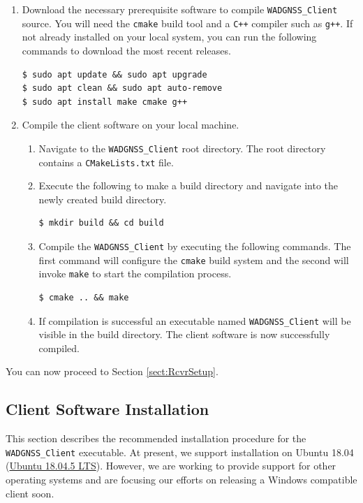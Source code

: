 \begin{enumerate}
\item Download the necessary prerequisite software to compile \texttt{WADGNSS\_Client} source. You will need the \texttt{cmake} build tool and a \texttt{C++} compiler such as \texttt{g++}. If not already installed on your local system, you can run the following commands to download the most recent releases.
\begin{verbatim}
$ sudo apt update && sudo apt upgrade 
$ sudo apt clean && sudo apt auto-remove 
$ sudo apt install make cmake g++ 
\end{verbatim}

\item Compile the client software on your local machine.

\begin{enumerate}
\item Navigate to the \texttt{WADGNSS\_Client} root directory. The root directory contains a \texttt{CMakeLists.txt} file.

\item Execute the following to make a build directory and navigate into the newly created build directory. 
\begin{verbatim}
$ mkdir build && cd build 
\end{verbatim}

\item Compile the \texttt{WADGNSS\_Client} by executing the following commands. The first command will configure the \texttt{cmake} build system and the second will invoke \texttt{make} to start the compilation process.
\begin{verbatim}
$ cmake .. && make 
\end{verbatim}

\item If compilation is successful an executable named \texttt{WADGNSS\_Client} will be visible in the build directory. The client software is now successfully compiled.
\end{enumerate}
\end{enumerate}
\noindent
You can now proceed to Section \ref{sect:RcvrSetup}. 
 
 
\subsection{Client Software Installation}
This section describes the recommended installation procedure for the \texttt{WADGNSS\_Client} executable. 
At present, we support installation on Ubuntu 18.04 (\href{https://releases.ubuntu.com/18.04/}{Ubuntu 18.04.5 LTS}). However, we are working to provide support for other operating systems and are focusing our efforts on releasing a Windows compatible client soon. 


